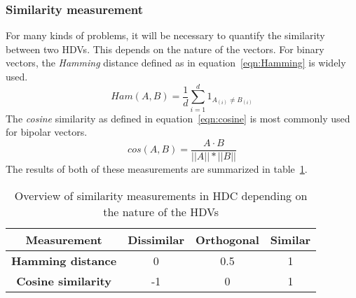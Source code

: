 \subsubsection{Similarity measurement} \label{sssec:sim}
For many kinds of problems, it will be necessary to quantify the similarity between two HDVs. This depends on the nature of the vectors. For binary vectors, the \textit{Hamming} distance defined as in equation~\ref{eqn:Hamming} is widely used.
\begin{equation}
    \label{eqn:Hamming}
    Ham(A, B) = \frac{1}{d} \sum_{i=1}^{d} 1_{A_{(i)} \neq B_{(i)}}
\end{equation}
The \textit{cosine} similarity as defined in equation~\ref{eqn:cosine} is most commonly used for bipolar vectors.
\begin{equation}
    \label{eqn:cosine}
    cos(A, B) = \frac{A \cdot B}{||A|| * ||B||}
\end{equation}
The results of both of these measurements are summarized in table~\ref{tab:dist}.
\begin{table}[h]
    \begin{tabular}{|c||c|c|c|}
        \hline
        \textbf{Measurement} & \textbf{Dissimilar} & \textbf{Orthogonal} & \textbf{Similar} \\
        \hline
        \textbf{Hamming distance} & 0 & 0.5 & 1 \\
        \hline
        \textbf{Cosine similarity} & -1 & 0 & 1 \\
        \hline
    \end{tabular}
    \caption{\label{tab:dist}Overview of similarity measurements in HDC depending on the nature of the HDVs} 
\end{table}
